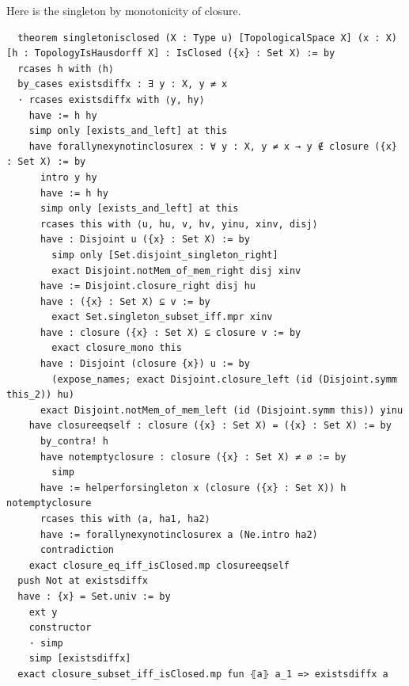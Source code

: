 \documentclass[11pt]{article}
\begin{document}
Here is the singleton by monotonicity of closure. 
\begin{verbatim}
  theorem singletonisclosed (X : Type u) [TopologicalSpace X] (x : X) [h : TopologyIsHausdorff X] : IsClosed ({x} : Set X) := by
  rcases h with ⟨h⟩
  by_cases existsdiffx : ∃ y : X, y ≠ x 
  · rcases existsdiffx with ⟨y, hy⟩
    have := h hy 
    simp only [exists_and_left] at this 
    have forallynexynotinclosurex : ∀ y : X, y ≠ x → y ∉ closure ({x} : Set X) := by 
      intro y hy
      have := h hy 
      simp only [exists_and_left] at this
      rcases this with ⟨u, hu, v, hv, yinu, xinv, disj⟩
      have : Disjoint u ({x} : Set X) := by 
        simp only [Set.disjoint_singleton_right]
        exact Disjoint.notMem_of_mem_right disj xinv
      have := Disjoint.closure_right disj hu 
      have : ({x} : Set X) ⊆ v := by 
        exact Set.singleton_subset_iff.mpr xinv
      have : closure ({x} : Set X) ⊆ closure v := by 
        exact closure_mono this
      have : Disjoint (closure {x}) u := by 
        (expose_names; exact Disjoint.closure_left (id (Disjoint.symm this_2)) hu)
      exact Disjoint.notMem_of_mem_left (id (Disjoint.symm this)) yinu
    have closureeqself : closure ({x} : Set X) = ({x} : Set X) := by 
      by_contra! h
      have notemptyclosure : closure ({x} : Set X) ≠ ∅ := by 
        simp 
      have := helperforsingleton x (closure ({x} : Set X)) h notemptyclosure 
      rcases this with ⟨a, ha1, ha2⟩
      have := forallynexynotinclosurex a (Ne.intro ha2) 
      contradiction
    exact closure_eq_iff_isClosed.mp closureeqself
  push Not at existsdiffx 
  have : {x} = Set.univ := by 
    ext y 
    constructor
    · simp
    simp [existsdiffx] 
  exact closure_subset_iff_isClosed.mp fun ⦃a⦄ a_1 => existsdiffx a
\end{verbatim}
\end{document}
